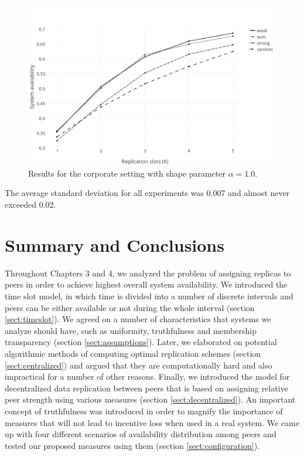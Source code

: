 \documentclass{pracamgren}
\begin{document}
\begin{figure}[h]
\centering
\includegraphics[scale=0.5]{graphs/corp_alpha_1.pdf}
\caption{Results for the corporate setting with shape parameter $\alpha=1.0$.}
\label{corp_alpha_1}
\end{figure}

The average standard deviation for all experiments was 0.007 and almost never exceeded 0.02.\\

\chapter{Summary and Conclusions}\label{chap:conclusions}

Throughout Chapters 3 and 4, we analyzed the problem of assigning replicas to peers in order to achieve highest overall system availability. We introduced the time slot model, in which time is divided into a number of discrete intervals and peers can be either available or not during the whole interval (section \ref{sect:timeslot}). We agreed on a number of characteristics that systems we analyze should have, such as uniformity, truthfulness and membership transparency (section \ref{sect:assumptions}). Later, we elaborated on potential algorithmic methods of computing optimal replication schemes  (section \ref{sect:centralized}) and argued that they are computationally hard and also impractical for a number of other reasons. Finally, we introduced the model for decentralized data replication between peers that is based on assigning relative peer strength using various measures (section \ref{sect:decentralized}). An important concept of truthfulness was introduced in order to magnify the importance of measures that will not lead to incentive loss when used in a real system. We came up with four different scenarios of availability distribution among peers and tested our proposed measures using them (section \ref{sect:configuration}).\\
\end{document}
